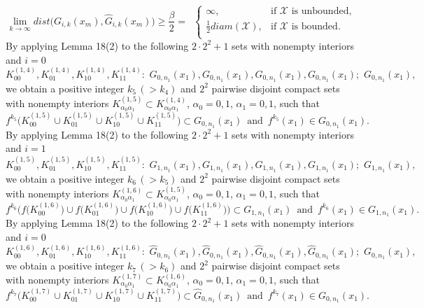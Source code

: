 \documentclass[12pt]{article}
\newcommand{\al}{\alpha}
\begin{document}
$$
\lim_{k \to \infty} dist\big(G_{i,k}(x_m), \widehat G_{i,k}(x_m)\big) \ge \frac {\beta}2 = \,\,\, \begin{cases}
                                                      \infty, & \text{if $\mathcal X$ is unbounded}, \\
                                                      \frac 12 diam(\mathcal X), & \text{if $\mathcal X$ is bounded}.\\
                                                      \end{cases}
$$
\indent By applying Lemma 18(2) to the following $2 \cdot 2^2+1$ sets with nonempty interiors and $i = 0$
$$
K_{00}^{(1,4)}, K_{01}^{(1,4)}, K_{10}^{(1,4)}, K_{11}^{(1,4)}: \,\, G_{0,n_1}(x_1), G_{0,n_1}(x_1), G_{0,n_1}(x_1), G_{0,n_1}(x_1); \,\, G_{0,n_1}(x_1),
$$
we obtain a positive integer $k_5 \, (> k_4)$ and $2^2$ pairwise disjoint compact sets with nonempty interiors $K_{\al_0\al_1}^{(1,5)} \subset K_{\al_0\al_1}^{(1,4)}$, $\al_0 = 0, 1$, $\al_1 = 0, 1$, such that 
$$
f^{k_5}\big(K_{00}^{(1,5)} \cup K_{01}^{(1,5)} \cup K_{10}^{(1,5)} \cup K_{11}^{(1,5)}\big) \subset G_{0,n_1}(x_1) \,\,\, \text{and} \,\,\, f^{k_5}(x_1) \in G_{0,n_1}(x_1).%
$$
\indent By applying Lemma 18(2) to the following $2 \cdot 2^2+1$ sets with nonempty interiors and $i = 1$
$$
K_{00}^{(1,5)}, K_{01}^{(1,5)}, K_{10}^{(1,5)}, K_{11}^{(1,5)}: \,\, G_{1,n_1}(x_1), G_{1,n_1}(x_1), G_{1,n_1}(x_1), G_{1,n_1}(x_1); \,\, G_{1,n_1}(x_1),
$$
we obtain a positive integer $k_6 \, (> k_5)$ and $2^2$ pairwise disjoint compact sets with nonempty interiors $K_{\al_0\al_1}^{(1,6)} \subset K_{\al_0\al_1}^{(1,5)}$, $\al_0 = 0, 1$, $\al_1 = 0, 1$, such that 
$$
f^{k_6}\bigg(f\big(K_{00}^{(1,6)}\big) \cup f\big(K_{01}^{(1,6)}\big) \cup f\big(K_{10}^{(1,6)}\big) \cup f\big(K_{11}^{(1,6)}\big)\bigg) \subset G_{1,n_1}(x_1) \,\,\, \text{and} \,\,\, f^{k_6}(x_1) \in G_{1,n_1}(x_1).
$$
\indent By applying Lemma 18(2) to the following $2 \cdot 2^2+1$ sets with nonempty interiors and $i = 0$
$$
K_{00}^{(1,6)}, K_{01}^{(1,6)}, K_{10}^{(1,6)}, K_{11}^{(1,6)}: \,\, \widehat G_{0,n_1}(x_1), \widehat G_{0,n_1}(x_1), \widehat G_{0,n_1}(x_1), \widehat G_{0,n_1}(x_1); \,\, G_{0,n_1}(x_1),
$$
we obtain a positive integer $k_7 \, (> k_6)$ and $2^2$ pairwise disjoint compact sets with nonempty interiors $K_{\al_0\al_1}^{(1,7)} \subset K_{\al_0\al_1}^{(1,6)}$, $\al_0 = 0, 1$, $\al_1 = 0, 1$, such that 
$$
f^{k_7}\big(K_{00}^{(1,7)} \cup K_{01}^{(1,7)} \cup K_{10}^{(1,7)} \cup K_{11}^{(1,7)}\big) \subset \widehat G_{0,n_1}(x_1) \,\,\, \text{and} \,\,\, f^{k_7}(x_1) \in G_{0,n_1}(x_1).
$$
\end{document}

